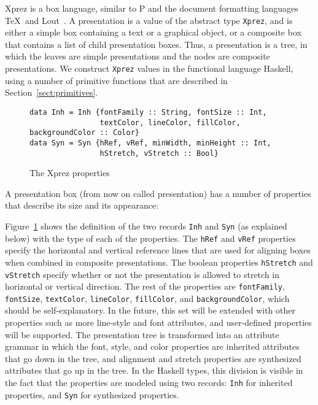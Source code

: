 {\sc Xprez} is a box language, similar to P and the document formatting languages \TeX ~and Lout~\cite{kingston93lout}. A presentation is a value of the abstract type \texttt{Xprez}, and is either a simple box containing a text or a graphical object, or a composite box that contains a list of child presentation boxes. Thus, a presentation is a tree, in which the leaves are simple presentations and the nodes are composite presentations. We construct \texttt{Xprez} values in the functional language Haskell, using a number of primitive functions that are described in Section~\ref{sect:primitives}.

\begin{figure}
\begin{small}
\begin{center}
\begin{small}
\begin{verbatim}
data Inh = Inh {fontFamily :: String, fontSize :: Int,
                textColor, lineColor, fillColor, backgroundColor :: Color} 
data Syn = Syn {hRef, vRef, minWidth, minHeight :: Int,
                hStretch, vStretch :: Bool}
\end{verbatim}
\end{small}
\caption{The {\sc Xprez} properties}\label{xprezproperties} 
\end{center}
\end{small}
\end{figure}


A presentation box (from now on called presentation) has a number of properties that describe its size and its appearance: 

\begin{center}
\end{center}

\toHere

Figure~\ref{xprezproperties} shows the definition of the two records \texttt{Inh} and \texttt{Syn} (as explained below) with the type of each of the properties. The \texttt{hRef} and \texttt{vRef} properties specify the horizontal and vertical reference lines that are used for aligning boxes when combined in composite presentations.  The boolean properties \texttt{hStretch} and \texttt{vStretch} specify whether or not the presentation is allowed to stretch in horizontal or vertical direction. The rest of the properties are \texttt{fontFamily}, \texttt{fontSize}, \texttt{textColor}, \texttt{lineColor}, \texttt{fillColor}, and \texttt{backgroundColor}, which should be self-explanatory. In the future, this set will be extended with other properties such as more line-style and font attributes, and user-defined properties will be supported. The presentation tree is transformed into an attribute grammar in which the font, style, and color properties are inherited attributes that go down in the tree, and alignment and stretch properties are synthesized attributes that go up in the tree. In the Haskell types, this division is visible in the fact that the properties are modeled using two records: \texttt{Inh} for inherited properties, and \texttt{Syn} for synthesized properties.


